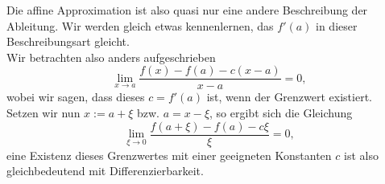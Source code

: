 Die affine Approximation ist also quasi nur eine andere Beschreibung der Ableitung. Wir werden gleich etwas kennenlernen, das $f'(a)$ in dieser Beschreibungsart gleicht.\\
Wir betrachten also anders aufgeschrieben
\begin{equation*}
    \lim_{x\to a}\frac{f(x)-f(a)-c(x-a)}{x-a}=0,
\end{equation*}
wobei wir sagen, dass dieses $c=f'(a)$ ist, wenn der Grenzwert existiert.\\
Setzen wir nun $x:=a+\xi$ bzw. $a=x-\xi$, so ergibt sich die Gleichung
\begin{equation*}
    \lim_{\xi\to0}\frac{f(a+\xi)-f(a)-c\xi}{\xi}=0,
\end{equation*}
eine Existenz dieses Grenzwertes mit einer geeigneten Konstanten $c$ ist also gleichbedeutend mit Differenzierbarkeit.\\
